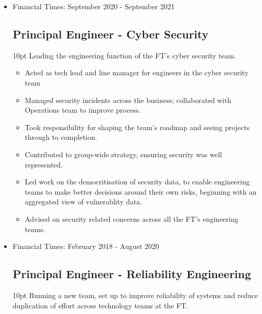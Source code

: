 \documentclass[a4paper]{article}
\newenvironment{detail}{\begin{adjustwidth}{10pt}{}}{\end{adjustwidth}}
\begin{document}
\begin{itemize}
\item Financial Times: September 2020 - September 2021
\subsection*{Principal Engineer - Cyber Security}
\begin{detail}
Leading the engineering function of the FT's cyber security team.

\begin{itemize}
	\item Acted as tech lead and line manager for engineers in the cyber security team
	\item Managed security incidents across the business; collaborated with Operations team to improve process.
	\item Took responsibility for shaping the team's roadmap and seeing projects through to completion.
	\item Contributed to group-wide strategy, ensuring security was well represented.
	\item Led work on the democritisation of security data, to enable engineering teams to make better decisions around their own risks, beginning with an aggregated view of vulnerablity data.
	\item Advised on security related concerns across all the FT's engineering teams.
\end{itemize}
\end{detail}

\pagebreak

\item Financial Times: February 2018 - August 2020
\subsection*{Principal Engineer - Reliability Engineering}
\begin{detail}
Running a new team, set up to improve reliability of systems and reduce duplication of effort across technology teams at the FT.


\end{detail}
\end{itemize}
\end{document}
